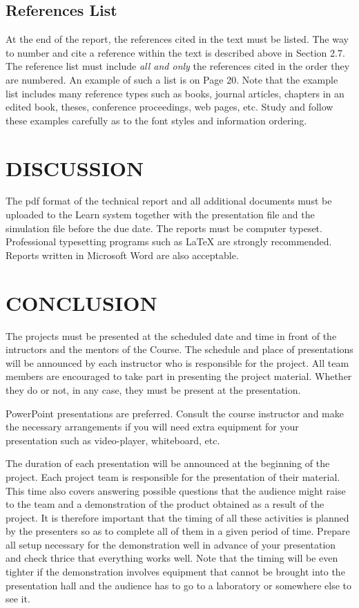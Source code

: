 \documentclass[12pt]{article} %
\numberwithin{equation}{section}
\numberwithin{figure}{section}
\numberwithin{table}{section}
\numberwithin{algorithm}{section}
\begin{document}
\subsection{References List}

At the end of the report, the references cited in the text must be listed. The way to number and cite a reference within the text is described above in Section 2.7. The reference list must include \emph{all and only} the references cited in the order they are numbered. An example of such a list is on Page 20. Note that the example list includes many reference types such as books, journal articles, chapters in an edited book, theses, conference proceedings, web pages, etc. Study and follow these examples carefully as to the font styles and information ordering.

\section{DISCUSSION}

The pdf format of the technical report and all additional documents must be uploaded to the Learn system together with the presentation file and the simulation file before the due date.
The reports must be computer typeset. Professional typesetting programs such as LaTeX are strongly recommended. Reports written in Microsoft Word are also acceptable.
 
\section{CONCLUSION}

The projects must be presented at the scheduled date and time in front of the intructors and the mentors of the Course. The schedule and place of presentations will be announced by each instructor who is responsible for the project. All team members are encouraged to take part in presenting the project material. Whether they do or not, in any case, they must be present at the presentation.

PowerPoint presentations are preferred. Consult the course instructor and make the necessary arrangements if you will need extra equipment for your presentation such as video-player, whiteboard, etc.

The duration of each presentation will be announced at the beginning of the project. Each project team is responsible for the presentation of their material. This time also covers answering possible questions that the audience might raise to the team and a demonstration of the product obtained as a result of the project. It is therefore important that the timing of all these activities is planned by the presenters so as to complete all of them in a given period of time. Prepare all setup necessary for the demonstration well in advance of your presentation and check thrice that everything works well. Note that the timing will be even tighter if the demonstration involves equipment that cannot be brought into the presentation hall and the audience has to go to a laboratory or somewhere else to see it.
\end{document}
